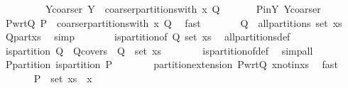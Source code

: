 \begin{isabellebody}
\ \ \ \ \ \ \ \ \ Y{\isacharunderscore}coarser{\isacharprime}{\isacharcolon}\ {\isachardoublequoteopen}Y\ {\isacharequal}\ coarser{\isacharunderscore}partitions{\isacharunderscore}with\ x\ Q{\isachardoublequoteclose}\ \isacommand{{\isachardot}{\isachardot}}\isamarkupfalse%
\isanewline
\ \ \ \ \isamarkupfalse%
\ P{\isacharunderscore}in{\isacharunderscore}Y\ Y{\isacharunderscore}coarser{\isacharprime}\ \isamarkupfalse%
\ P{\isacharunderscore}wrt{\isacharunderscore}Q{\isacharcolon}\ {\isachardoublequoteopen}P\ {\isasymin}\ coarser{\isacharunderscore}partitions{\isacharunderscore}with\ x\ Q{\isachardoublequoteclose}\ \isamarkupfalse%
\ fast\isanewline
\ \ \ \ \isamarkupfalse%
\ \isamarkupfalse%
\ {\isachardoublequoteopen}Q\ {\isasymin}\ all{\isacharunderscore}partitions\ {\isacharparenleft}set\ xs{\isacharparenright}{\isachardoublequoteclose}\ \isamarkupfalse%
\ Q{\isacharunderscore}part{\isacharunderscore}xs\ \isamarkupfalse%
\ simp\isanewline
\ \ \ \ \isamarkupfalse%
\ \isamarkupfalse%
\ {\isachardoublequoteopen}is{\isacharunderscore}partition{\isacharunderscore}of\ Q\ {\isacharparenleft}set\ xs{\isacharparenright}{\isachardoublequoteclose}\ \isamarkupfalse%
\ all{\isacharunderscore}partitions{\isacharunderscore}def\ \isacommand{{\isachardot}{\isachardot}}\isamarkupfalse%
\isanewline
\ \ \ \ \isamarkupfalse%
\ \isamarkupfalse%
\ {\isachardoublequoteopen}is{\isacharunderscore}partition\ Q{\isachardoublequoteclose}\ \ Q{\isacharunderscore}covers{\isacharcolon}\ {\isachardoublequoteopen}{\isasymUnion}\ Q\ {\isacharequal}\ set\ xs{\isachardoublequoteclose}\isanewline
\ \ \ \ \ \ \isamarkupfalse%
\ is{\isacharunderscore}partition{\isacharunderscore}of{\isacharunderscore}def\ \isamarkupfalse%
\ simp{\isacharunderscore}all\isanewline
\ \ \ \ \isamarkupfalse%
\ \isamarkupfalse%
\ P{\isacharunderscore}partition{\isacharcolon}\ {\isachardoublequoteopen}is{\isacharunderscore}partition\ P{\isachardoublequoteclose}\isanewline
\ \ \ \ \ \ \isamarkupfalse%
\ partition{\isacharunderscore}extension{}\ P{\isacharunderscore}wrt{\isacharunderscore}Q\ x{\isacharunderscore}notin{\isacharunderscore}xs\ \isamarkupfalse%
\ fast\isanewline
\ \ \ \ \isamarkupfalse%
\ {\isachardoublequoteopen}{\isasymUnion}\ P\ {\isacharequal}\ set\ xs\ {\isasymunion}\ {\isacharbraceleft}x{\isacharbraceright}{\isachardoublequoteclose}\isanewline

\end{isabellebody}

